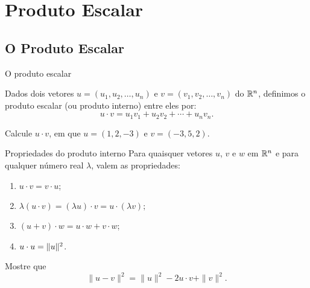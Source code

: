 \section{Produto Escalar}

\subsection*{O Produto Escalar}

\begin{frame}[label=vetores2]{O produto escalar}

\begin{defin}
Dados dois vetores $u=(u_1,u_2,\ldots,u_n)$ e $v=(v_1,v_2,\ldots,v_n)$ do $\mathbb{R}^n$, definimos o {\color{blue} produto escalar (ou produto interno)} entre eles por:
\[u\cdot v=u_1v_1+u_2v_2+\cdots+ u_nv_n.\]
\end{defin}

\begin{exe}
Calcule $u\cdot v$, em que $u=(1,2,-3)$ e $v=(-3,5,2)$.
\end{exe}

\end{frame}

\begin{frame}[label=vetores2]

\begin{block}{Propriedades do produto interno} Para quaisquer vetores $u$, ${v}$ e ${w}$ em $\mathbb{R}^n$ e para qualquer número real $\lambda$, valem as propriedades:
			
			\begin{enumerate}
				\item ${u}\cdot {v}={v}\cdot{u}$;
				\item $\lambda( {u}\cdot {v})=(\lambda  {u})\cdot {v}=  {u}\cdot(\lambda {v});$
				\item $( {u}+ {v})\cdot {w}= {u}\cdot {w}+ {v}\cdot {w}$;
				\item $ {u}\cdot {u}=\| {u}\|^2$.
			\end{enumerate}            
		\end{block}
\begin{exe}
Mostre que
\[\|u-v\|^2=\|u\|^2-2u\cdot v+\|v\|^2.\]
\end{exe}

\end{frame}

